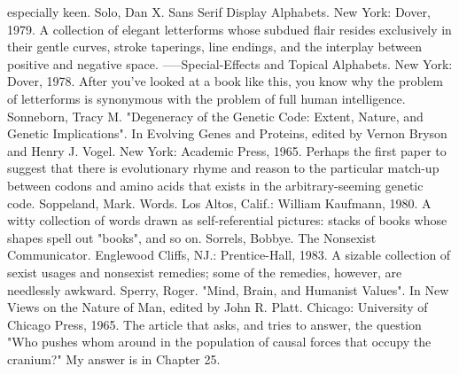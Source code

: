   especially keen.
Solo, Dan X. Sans Serif Display Alphabets. New York: Dover, 1979. A collection of elegant
  letterforms whose subdued flair resides exclusively in their gentle curves, stroke taperings,
  line endings, and the interplay between positive and negative space.
-----Special-Effects and Topical Alphabets. New York: Dover, 1978. After you've looked at a
  book like this, you know why the problem of letterforms is synonymous with the problem
  of full human intelligence.
Sonneborn, Tracy M. "Degeneracy of the Genetic Code: Extent, Nature, and Genetic
  Implications". In Evolving Genes and Proteins, edited by Vernon Bryson and
Henry J. Vogel. New York: Academic Press, 1965. Perhaps the first paper to suggest that
  there is evolutionary rhyme and reason to the particular match-up between codons and
  amino acids that exists in the arbitrary-seeming genetic code.
Soppeland, Mark. Words. Los Altos, Calif.: William Kaufmann, 1980. A witty collection of
  words drawn as self-referential pictures: stacks of books whose shapes spell out "books",
  and so on.
Sorrels, Bobbye. The Nonsexist Communicator. Englewood Cliffs, NJ.: Prentice-Hall, 1983.
  A sizable collection of sexist usages and nonsexist remedies; some of the remedies,
  however, are needlessly awkward.
Sperry, Roger. "Mind, Brain, and Humanist Values". In New Views on the Nature of Man,
  edited by John R. Platt. Chicago: University of Chicago Press, 1965. The article that asks,
  and tries to answer, the question "Who pushes whom around in the population of causal
  forces that occupy the cranium?" My answer is in Chapter 25.



